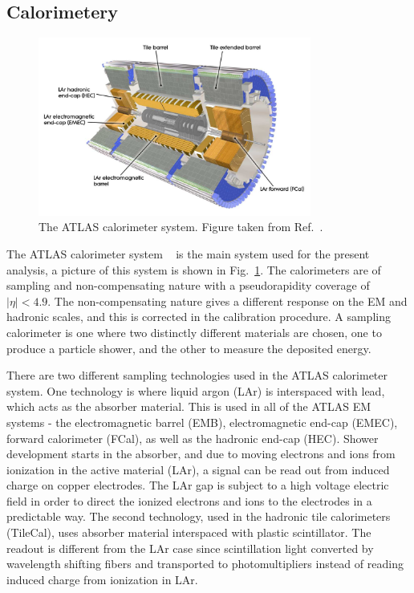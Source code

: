 {\subsection{Calorimetery}

\begin{figure}
	\centering
	\includegraphics[width=0.8\textwidth]{figures/calorimeters.pdf} %
	\caption{The ATLAS calorimeter system. Figure taken from Ref.~\cite{Aad:2008zzm}.}	
	\label{fig:calorimeters}
\end{figure}

The ATLAS calorimeter system ~\cite{Aad:2008zzm} is the main system used for the present analysis, a picture of this system is shown in Fig.~\ref{fig:calorimeters}. The calorimeters are of sampling and non-compensating nature with a pseudorapidity coverage of $|\eta|<4.9$. The non-compensating nature gives a different response on the EM and hadronic scales, and this is corrected in the calibration procedure. A sampling calorimeter is one where two distinctly different materials are chosen, one to produce a particle shower, and the other to measure the deposited energy. 

There are two different sampling technologies used in the ATLAS calorimeter system. One technology is where liquid argon (LAr) is interspaced with lead, which acts as the absorber material. This is used in all of the ATLAS EM systems - the electromagnetic barrel (EMB), electromagnetic end-cap (EMEC), forward calorimeter (FCal), as well as the hadronic end-cap (HEC). Shower development starts in the absorber, and due to moving electrons and ions from ionization in the active material (LAr), a signal can be read out from induced charge on copper electrodes. The LAr gap is subject to a high voltage electric field in order to direct the ionized electrons and ions to the electrodes in a predictable way. The second technology, used in the hadronic tile calorimeters (TileCal), uses absorber material interspaced with plastic scintillator. The readout is different from the LAr case since scintillation light converted by wavelength shifting fibers and transported to photomultipliers instead of reading induced charge from ionization in LAr.

}
